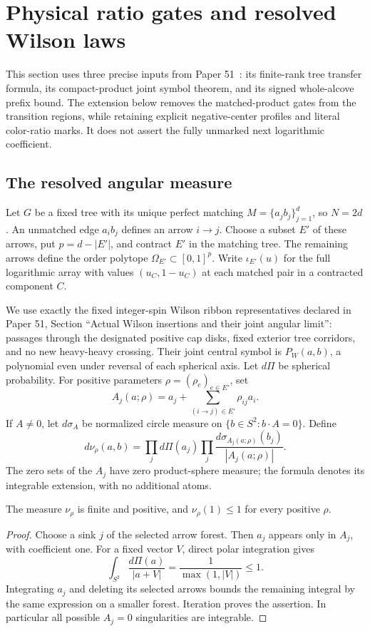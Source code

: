 \section{Physical ratio gates and resolved Wilson laws}
\label{sec:ratio}

This section uses three precise inputs from Paper 51~\cite{p51}: its finite-rank
tree transfer formula, its compact-product joint symbol theorem, and
its signed whole-alcove prefix bound. The extension below removes the
matched-product gates from the transition regions, while retaining
explicit negative-center profiles and literal color-ratio marks.
It does not assert the fully unmarked next logarithmic coefficient.

\subsection{The resolved angular measure}
Let $G$ be a fixed tree with its unique perfect matching
$M=\{a_jb_j\}_{j=1}^d$, so $N=2d$. An unmatched edge $a_i b_j$
defines an arrow $i\to j$. Choose a subset $E'$ of these arrows,
put $p=d-|E'|$, and contract $E'$ in the matching tree. The remaining
arrows define the order polytope $\Omega_{E'}\subset[0,1]^p$.
Write $\iota_{E'}(u)$ for the full logarithmic array with values
$(u_C,1-u_C)$ at each matched pair in a contracted component $C$.

We use exactly the fixed integer-spin Wilson ribbon representatives
declared in Paper 51, Section ``Actual Wilson insertions and their
joint angular limit'': passages through the designated positive cap
disks, fixed exterior tree corridors, and no new heavy-heavy crossing.
Their joint central symbol is $P_W(a,b)$, a polynomial even under
reversal of each spherical axis. Let $d\Pi$ be spherical probability.
For positive parameters $\rho=(\rho_e)_{e\in E'}$, set
\[
 A_j(a;\rho)=a_j+\sum_{(i\to j)\in E'}\rho_{ij}a_i.
\]
If $A\ne0$, let $d\sigma_A$ be normalized circle measure on
$\{b\in S^2:b\cdot A=0\}$. Define
\begin{equation}\label{eq:ratio-measure}
 d\nu_\rho(a,b)=\prod_j d\Pi(a_j)
       \prod_j\frac{d\sigma_{A_j(a;\rho)}(b_j)}{|A_j(a;\rho)|}.
\end{equation}
The zero sets of the $A_j$ have zero product-sphere measure; the
formula denotes its integrable extension, with no additional atoms.

\begin{lemma}\label{lem:ratio-finite}
The measure $\nu_\rho$ is finite and positive, and
$\nu_\rho(1)\le1$ for every positive $\rho$.
\end{lemma}
\begin{proof}
Choose a sink $j$ of the selected arrow forest. Then $a_j$ appears
only in $A_j$, with coefficient one. For a fixed vector $V$,
direct polar integration gives
\[
 \int_{S^2}\frac{d\Pi(a)}{|a+V|}
   =\frac1{\max(1,|V|)}\le1.
\]
Integrating $a_j$ and deleting its selected arrows bounds the
remaining integral by the same expression on a smaller forest.
Iteration proves the assertion. In particular all possible
$A_j=0$ singularities are integrable.
\end{proof}

